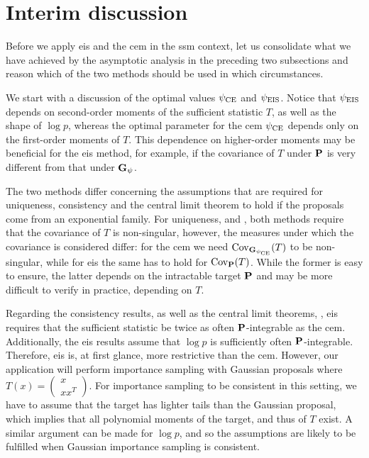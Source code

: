 \section{Interim discussion}
\label{sec:interim-discussion}

Before we apply \gls{eis} and the \gls{cem} in the \gls{ssm} context, let us consolidate what we have achieved by the asymptotic analysis in the preceding two subsections and reason which of the two methods should be used in which circumstances.

We start with a discussion of the optimal values $\pce$ and $\peis$.
Notice that $\peis$ depends on second-order moments of the sufficient statistic $T$, as well as the shape of $\log p$, whereas the optimal parameter for the \gls{cem} $\pce$ depends only on the first-order moments of $T$. 
This dependence on higher-order moments may be beneficial for the \gls{eis} method, for example, if the covariance of $T$ under $\P$ is very different from that under $\G_{\psi}$. 


The two methods differ concerning the assumptions that are required for uniqueness, consistency and the central limit theorem to hold if the proposals come from an exponential family. 
For uniqueness,  and , both methods require that the covariance of $T$ is non-singular, however, the measures under which the covariance is considered differ: for the \gls{cem} we need $\cov_{\G_{\pce}} (T)$ to be non-singular, while for \gls{eis} the same has to hold for $\cov_{\P} (T)$. While the former is easy to ensure, the latter depends on the intractable target $\P$ and may be more difficult to verify in practice, depending on $T$. 

Regarding the consistency results,  as well as the central limit theorems, , \gls{eis} requires that the sufficient statistic be twice as often $\P$-integrable as the \gls{cem}. Additionally, the \gls{eis} results assume that $\log p$ is sufficiently often $\P$-integrable. Therefore, \gls{eis} is, at first glance, more restrictive than the \gls{cem}. However, our application will perform importance sampling with Gaussian proposals where $T(x) = \begin{pmatrix} x \\ xx^{T}\end{pmatrix}$. For importance sampling to be consistent in this setting, we have to assume that the target has lighter tails than the Gaussian proposal, which implies that all polynomial moments of the target, and thus of $T$ exist. A similar argument can be made for $\log p$, and so the assumptions are likely to be fulfilled when Gaussian importance sampling is consistent.

